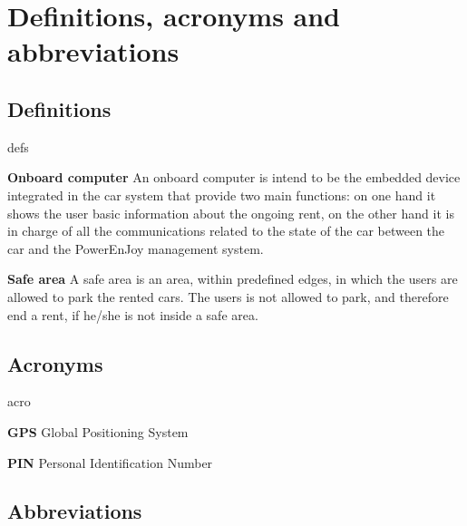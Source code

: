 \section{Definitions, acronyms and abbreviations}

\subsection{Definitions}
	\begin{labeling}{defs}
		\item[\textbf{Onboard computer}] An onboard computer is intend to be the embedded device integrated in the car system that provide two main functions: on one hand it shows the user basic information about the ongoing rent, on the other hand it is in charge of all the communications related to the state of the car between the car and the PowerEnJoy management system.
		\item[\textbf{Safe area}] A safe area is an area, within predefined edges, in which the users are allowed to park the rented cars. The users is not allowed to park, and therefore end a rent, if he/she is not inside a safe area.
	\end{labeling}
\subsection{Acronyms}
	\begin{labeling}{acro}
		\item[\textbf{GPS}] Global Positioning System
		\item[\textbf{PIN}] Personal Identification Number
	\end{labeling}
\subsection{Abbreviations}
